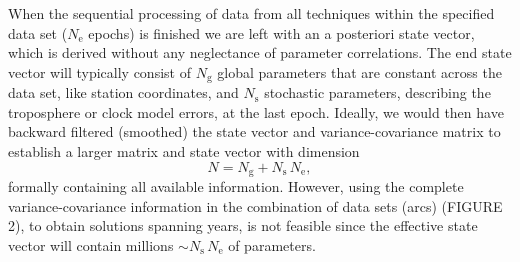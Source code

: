 When the sequential processing of data from all techniques within the
specified data set ($N_\mathrm{e}$ epochs) is finished we are left with an a posteriori state
vector, which is derived without any neglectance
of parameter correlations. The end state vector will typically consist
of $N_\mathrm{g}$ global parameters that are constant across the data set, like
station coordinates, and $N_\mathrm{s}$ stochastic parameters, describing the
troposphere or clock model errors, at the last epoch. Ideally, we
would then have backward filtered (smoothed) the state vector and
variance-covariance matrix to establish a larger matrix and state vector with dimension
\begin{equation}\nonumber
N=N_\mathrm{g}+N_\mathrm{s}\,N_\mathrm{e},
\end{equation}
formally containing all available information. However, using the complete variance-covariance information in the combination of data sets (arcs) (FIGURE 2), to obtain solutions spanning years,
is not feasible since the effective state vector will contain millions $\sim{}N_\mathrm{s}\,N_\mathrm{e}$ of parameters.

\endinput
